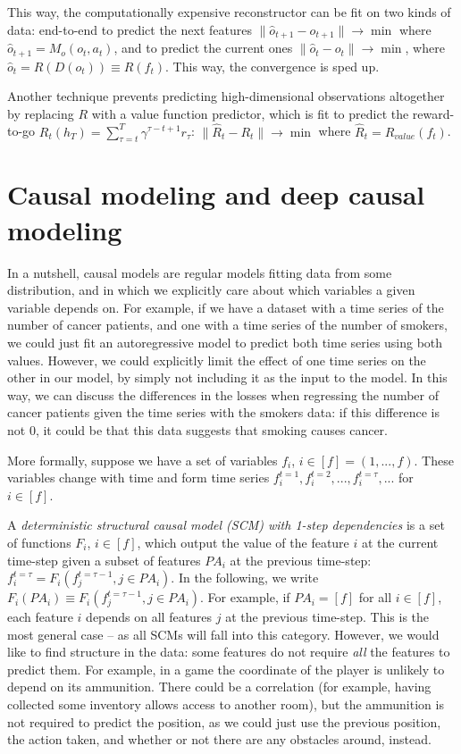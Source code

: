 \documentclass[a4paper,11pt,oneside]{report}
\begin{document}
This way, the computationally expensive reconstructor can be fit on two kinds of data: end-to-end to predict the next features $\|\hat{o}_{t+1}-o_{t+1}\|\to\min$ where $\hat{o}_{t+1}=M_o(o_t, a_t)$, and to predict the current ones $\|\hat{o}_t-o_t\|\to\min$, where $\hat{o}_t=R(D(o_t))\equiv R(f_t)$. This way, the convergence is sped up.

Another technique prevents predicting high-dimensional observations altogether by replacing $R$ with a value function predictor, which is fit to predict the reward-to-go $R_t(h_T)=\sum\limits_{\tau=t}^{T}\gamma^{\tau-t+1}r_{\tau}$:
$\|\hat{R}_t-R_t\|\to\min$ where $\hat{R}_t=R_{value}(f_t)$.

\section{Causal modeling and deep causal modeling}
\label{sec:causal}
In a nutshell, causal models are regular models fitting data from some distribution, and in which we explicitly care about which variables a given variable depends on. For example, if we have a dataset with a time series of the number of cancer patients, and one with a time series of the number of smokers, we could just fit an autoregressive model to predict both time series using both values. However, we could explicitly limit the effect of one time series on the other in our model, by simply not including it as the input to the model. In this way, we can discuss the differences in the losses when regressing the number of cancer patients given the time series with the smokers data: if this difference is not 0, it could be that this data suggests that smoking causes cancer.

More formally, suppose we have a set of variables $f_i$, $i\in[f]=(1, ..., f)$. These variables change with time and form time series $f_i^{t=1},f_i^{t=2},...,f_i^{t=\tau},...$ for $i\in[f]$.

A {\em deterministic structural causal model (SCM) with 1-step dependencies} is a set of functions $F_i$, $i\in[f]$, which output the value of the feature $i$ at the current time-step given a subset of features $PA_i$ at the previous time-step: $f_i^{t=\tau}=F_i(f_j^{t=\tau-1},j\in PA_i)$. In the following, we write $F_i(PA_i)\equiv F_i(f_j^{t=\tau-1},j\in PA_i)$. For example, if $PA_i=[f]$ for all $i\in[f]$, each feature $i$ depends on all features $j$ at the previous time-step. This is the most general case -- as all SCMs will fall into this category. However, we would like to find structure in the data: some features do not require {\em all} the features to predict them. For example, in a game the coordinate of the player is unlikely to depend on its ammunition. There could be a correlation (for example, having collected some inventory allows access to another room), but the ammunition is not required to predict the position, as we could just use the previous position, the action taken, and whether or not there are any obstacles around, instead.
\end{document}
